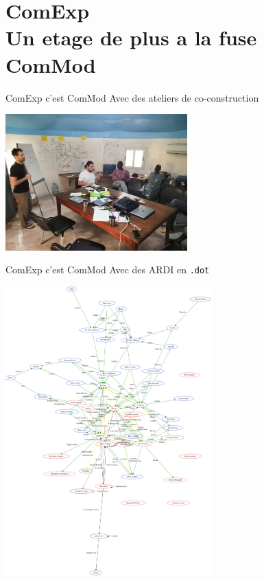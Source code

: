 \documentclass[newPxFont]{beamer}
\begin{document}

\section{ComExp\\ Un etage de plus a la fuse ComMod}


\begin{frame}[c]{ComExp c'est ComMod}
  \vspace{-1cm}
  Avec des ateliers de co-construction
  \begin{center}
  \includegraphics[width=7cm]{img/atelier_niakhar.jpg}
  \end{center}
\end{frame}

\begin{frame}[c]{ComExp c'est ComMod}
  \vspace{-1cm}
  Avec des ARDI en \texttt{.dot}
  \begin{center}
  \includegraphics[width=8cm]{img/pardi_fdp.png}
  \end{center}
\end{frame}
\end{document}
